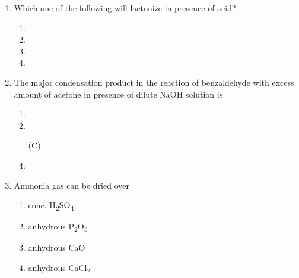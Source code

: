 \documentclass[journal,12pt,onecolumn]{IEEEtran}
\begin{document}
\begin{enumerate}
\item Which one of the following will lactonize in presence of acid?
\begin{multicols}{4}
\begin{enumerate}[label=(\Alph*)]
 \item{}
 \item{}
 \item{}
 \item{}
\end{enumerate}
\end{multicols}

\item The major condensation product in the reaction of benzaldehyde with excess amount of acetone in presence of dilute NaOH solution is
\begin{multicols}{2}
\begin{enumerate}[label=(\Alph*)]
\item{}

  \item  {}
  \item[(C)]
  \item    {}
\end{enumerate}
\end{multicols}

\item Ammonia gas can be dried over
\begin{multicols}{4}
\begin{enumerate}[label=(\Alph*)]
\item conc. H\textsubscript{2}SO\textsubscript{4}
\item anhydrous P\textsubscript{2}O\textsubscript{5}
\item anhydrous CaO
\item anhydrous CaCl\textsubscript{2}
\end{enumerate}
\end{multicols}


\end{enumerate}
\end{document}
